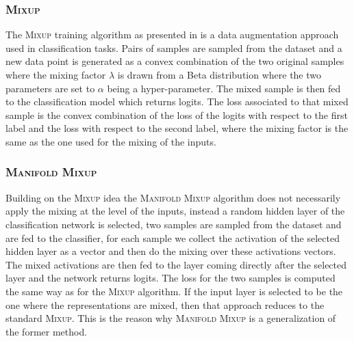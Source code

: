\documentclass[nohyperref]{article}
\theoremstyle{plain}
\theoremstyle{definition}
\theoremstyle{remark}
\begin{document}
\subsubsection{\textsc{Mixup}}
The \textsc{Mixup} training algorithm as presented in \cite{mixup1} is a data augmentation approach used in classification tasks. Pairs of samples are sampled from the dataset and a new data point is generated as a convex combination of the two original samples where the mixing factor $\lambda$ is drawn from a Beta distribution where the two parameters are set to $\alpha$ being a hyper-parameter. The mixed sample is then fed to the classification model which returns logits. The loss associated to that mixed sample is the convex combination of the loss of the logits with respect to the first label and the loss with respect to the second label, where the mixing factor is the same as the one used for the mixing of the inputs.

\subsubsection{\textsc{Manifold Mixup}}

Building on the \textsc{Mixup} idea the \textsc{Manifold Mixup} algorithm does not necessarily apply the mixing at the level of the inputs, instead a random hidden layer of the classification network is selected, two samples are sampled from the dataset and are fed to the classifier, for each sample we collect the activation of the selected hidden layer as a vector and then do the mixing over these activations vectors. The mixed activations are then fed to the layer coming directly after the selected layer and the network returns logits. The loss for the two samples is computed the same way as for the \textsc{Mixup} algorithm. If the input layer is selected to be the one where the representations are mixed, then that approach reduces to the standard \textsc{Mixup}. This is the reason why \textsc{Manifold Mixup} is a generalization of the former method.
\end{document}
